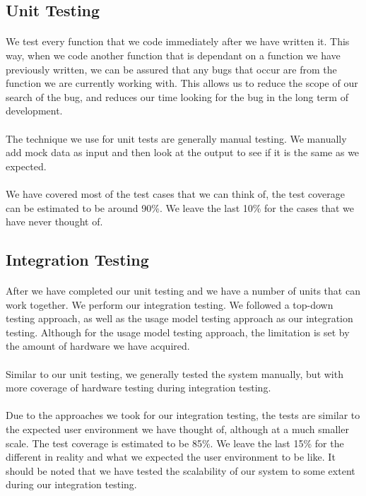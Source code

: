 \documentclass{article}
\begin{document}
\subsection{Unit Testing}
\paragraph{}We test every function that we code immediately after we have written it. This way, when we code another function that is dependant on a function we have previously written, we can be assured that any bugs that occur are from the function we are currently working with. This allows us to reduce the scope of our search of the bug, and reduces our time looking for the bug in the long term of development.

\paragraph{}The technique we use for unit tests are generally manual testing. We manually add mock data as input and then look at the output to see if it is the same as we expected.

\paragraph{}We have covered most of the test cases that we can think of, the test coverage can be estimated to be around 90\%. We leave the last 10\% for the cases that we have never thought of.

\subsection{Integration Testing}
\paragraph{}After we have completed our unit testing and we have a number of units that can work together. We perform our integration testing. We followed a top-down testing approach, as well as the usage model testing approach as our integration testing. Although for the usage model testing approach, the limitation is set by the amount of hardware we have acquired.

\paragraph{}Similar to our unit testing, we generally tested the system manually, but with more coverage of hardware testing during integration testing.

\paragraph{}Due to the approaches we took for our integration testing, the tests are similar to the expected user environment we have thought of, although at a much smaller scale. The test coverage is estimated to be 85\%. We leave the last 15\% for the different in reality and what we expected the user environment to be like. It should be noted that we have tested the scalability of our system to some extent during our integration testing.
\end{document}
